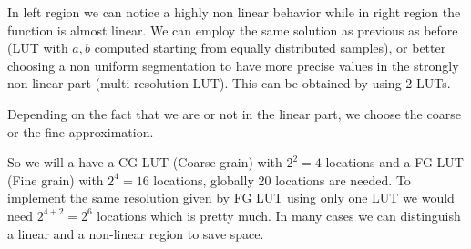 In left region we can notice a highly non linear behavior while in right region the function is almost linear. We can employ the same solution as previous as before (LUT with $a,b$ computed starting from equally distributed samples), or better choosing a non uniform segmentation to have more precise values in the strongly non linear part (multi resolution LUT). This can be obtained by using 2 LUTs.

Depending on the fact that we are or not in the linear part, we choose the coarse or the fine approximation.

So we will a have a CG LUT (Coarse grain) with $2^2=4$ locations and a FG LUT (Fine grain) with $2^4=16$ locations, globally 20 locations are needed.
To implement the same resolution given by FG LUT using only one LUT we would need $2^{4+2}=2^6$ locations which is pretty much. In many cases we can distinguish a linear and a non-linear region to save space.
